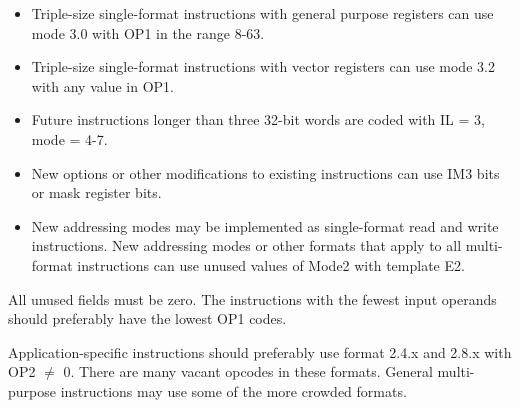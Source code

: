 \documentclass[forwardcom.tex]{subfiles}
\begin{document}
\begin{itemize}
\item Triple-size single-format instructions with general purpose registers can use mode 3.0 with OP1 in the range 8-63.

\item Triple-size single-format instructions with vector registers can use mode 3.2 with any value in OP1.

\item Future instructions longer than three 32-bit words are coded with IL = 3, mode = 4-7.

\item New options or other modifications to existing instructions can use IM3 bits or mask register bits.

\item New addressing modes may be implemented as single-format read and write instructions. New addressing modes or other formats that apply to all multi-format instructions can use unused values of Mode2 with template E2.


\end{itemize}

All unused fields must be zero. The instructions with the fewest input operands should preferably have the lowest OP1 codes. 
\vspace{2mm}

Application-specific instructions should preferably use format 2.4.x and 2.8.x with OP2 $\neq$ 0. There are many vacant opcodes in these formats. General multi-purpose instructions may use some of the more crowded formats.
\end{document}
